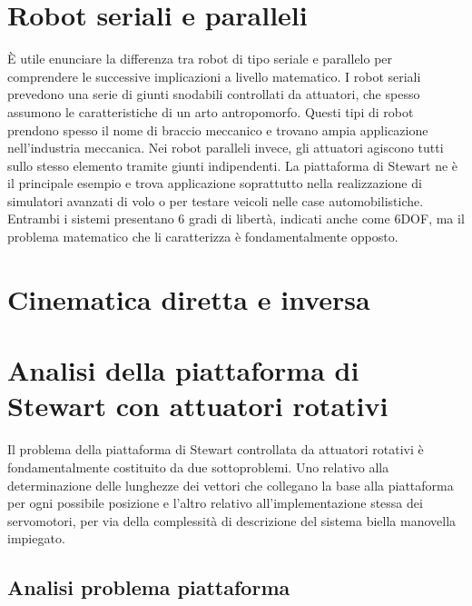 \documentclass[11pt]{article}
\begin{document}
\section{Robot seriali e paralleli}\label{robotserialiparalleli}
È utile enunciare la differenza tra robot di tipo seriale e parallelo per comprendere le successive implicazioni a livello matematico.
I robot seriali prevedono una serie di giunti snodabili controllati da attuatori, che spesso assumono le caratteristiche di un arto antropomorfo. 
Questi tipi di robot prendono spesso il nome di braccio meccanico e trovano ampia applicazione nell'industria meccanica.
Nei robot paralleli invece, gli attuatori agiscono tutti sullo stesso elemento tramite giunti indipendenti. 
La piattaforma di Stewart ne è il principale esempio e trova applicazione soprattutto nella realizzazione di simulatori avanzati di volo o per testare veicoli nelle case automobilistiche.
Entrambi i sistemi presentano 6 gradi di libertà, indicati anche come 6DOF, ma il problema matematico che li caratterizza è fondamentalmente opposto.


\section{Cinematica diretta e inversa}\label{cinematicadirettainversa}

\newpage
\section{Analisi della piattaforma di Stewart con attuatori rotativi}\label{analisi}

Il problema della piattaforma di Stewart controllata da attuatori rotativi è fondamentalmente costituito da due sottoproblemi.
Uno relativo alla determinazione delle lunghezze dei vettori che collegano la base alla piattaforma per ogni possibile posizione e l'altro relativo all'implementazione stessa dei servomotori, per via della complessità di descrizione del sistema biella manovella impiegato. 

\subsection{Analisi problema piattaforma}
\end{document}
